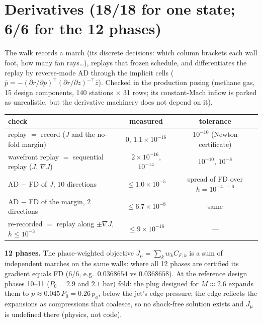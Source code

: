 \section{Derivatives (18/18 for one state; 6/6 for the 12 phases)}\label{s:der}
The walk records a march (its discrete decisions: which column brackets each wall foot, how many fan rays\dots),
replays that frozen schedule, and differentiates the replay by reverse-mode AD through the implicit cells
($\bar p=-(\partial r/\partial p)^\top(\partial r/\partial z)^{-\top}\bar z$). Checked in the production posing
(methane gas, 15 design components, 140 stations $\times$ 31 rows; its constant-Mach inflow is parked as unrealistic,
but the derivative machinery does not depend on it).
\begin{center}\small
\begin{tabular}{lcc}\toprule
check & measured & tolerance\\\midrule
replay $=$ record ($J$ and the no-fold margin) & $0$, $1.1\times10^{-16}$ & $10^{-10}$ (Newton certificate)\\
wavefront replay $=$ sequential replay ($J$, $\nabla J$) & $2\times10^{-16}$, $10^{-14}$ & $10^{-10}$, $10^{-8}$\\
AD $-$ FD of $J$, 10 directions & $\le1.0\times10^{-5}$ & spread of FD over $h=10^{-4..-6}$\\
AD $-$ FD of the margin, 2 directions & $\le6.7\times10^{-8}$ & same\\
re-recorded $=$ replay along $\pm\nabla J$, $h\le10^{-3}$ & $\le9\times10^{-16}$ & ---\\\bottomrule
\end{tabular}\end{center}

\textbf{12 phases.} The phase-weighted objective $J_\mu=\sum_k w_kC_{F,k}$ is a sum of independent marches on the same
walls: where all 12 phases are certified its gradient equals FD (6/6, e.g.\ $0.0368654$ vs $0.0368658$). At the
reference design phases 10--11 ($P_0=2.9$ and $2.1$ bar) fold: the plug designed for $M\approx2.6$ expands them to
$p\approx0.045\,P_0=0.26\,p_a$, below the jet's edge pressure; the edge reflects the expansions as compressions that
coalesce, so no shock-free solution exists and $J_\mu$ is undefined there (physics, not code).
